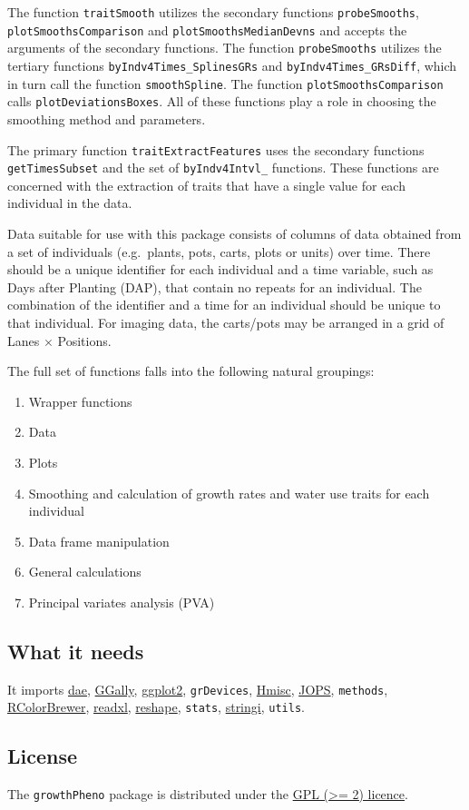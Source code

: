 \documentclass[
]{article}
\begin{document}
The function \texttt{traitSmooth} utilizes the secondary functions
\texttt{probeSmooths}, \texttt{plotSmoothsComparison} and
\texttt{plotSmoothsMedianDevns} and accepts the arguments of the
secondary functions. The function \texttt{probeSmooths} utilizes the
tertiary functions \texttt{byIndv4Times\_SplinesGRs} and
\texttt{byIndv4Times\_GRsDiff}, which in turn call the function
\texttt{smoothSpline}. The function \texttt{plotSmoothsComparison} calls
\texttt{plotDeviationsBoxes}. All of these functions play a role in
choosing the smoothing method and parameters.

The primary function \texttt{traitExtractFeatures} uses the secondary
functions \texttt{getTimesSubset} and the set of \texttt{byIndv4Intvl\_}
functions. These functions are concerned with the extraction of traits
that have a single value for each individual in the data.

Data suitable for use with this package consists of columns of data
obtained from a set of individuals (e.g.~plants, pots, carts, plots or
units) over time. There should be a unique identifier for each
individual and a time variable, such as Days after Planting (DAP), that
contain no repeats for an individual. The combination of the identifier
and a time for an individual should be unique to that individual. For
imaging data, the carts/pots may be arranged in a grid of Lanes
\(\times\) Positions.

The full set of functions falls into the following natural groupings:

\begin{enumerate}
\def\labelenumi{(\roman{enumi})}
\item
  Wrapper functions
\item
  Data
\item
  Plots
\item
  Smoothing and calculation of growth rates and water use traits for
  each individual
\item
  Data frame manipulation
\item
  General calculations
\item
  Principal variates analysis (PVA)
\end{enumerate}

\hypertarget{what-it-needs}{%
\subsection{What it needs}\label{what-it-needs}}

It imports \href{https://CRAN.R-project.org/package=dae}{dae},
\href{https://CRAN.R-project.org/package=GGally}{GGally},
\href{https://CRAN.R-project.org/package=ggplot2}{ggplot2},
\texttt{grDevices},
\href{https://CRAN.R-project.org/package=Hmisc}{Hmisc},
\href{https://CRAN.R-project.org/package=JOPS}{JOPS}, \texttt{methods},
\href{https://CRAN.R-project.org/package=RColorBrewer}{RColorBrewer},
\href{https://CRAN.R-project.org/package=readxl}{readxl},
\href{https://CRAN.R-project.org/package=reshape}{reshape},
\texttt{stats},
\href{https://CRAN.R-project.org/package=stringi}{stringi},
\texttt{utils}.

\hypertarget{license}{%
\subsection{License}\label{license}}

The \texttt{growthPheno} package is distributed under the
\href{https://opensource.org/licenses/GPL-2.0}{GPL (\textgreater= 2)
licence}.
\end{document}

